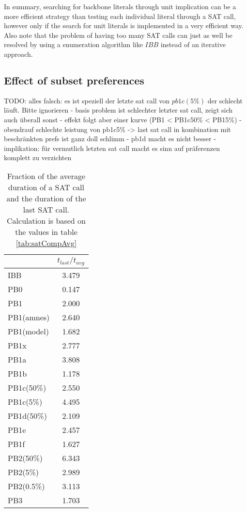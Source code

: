 In summary, searching for backbone literals through unit implication can be a more efficient strategy than testing each individual literal through a SAT call, however only if the search for unit literals is implemented in a very efficient way. Also note that the problem of having too many SAT calls can just as well be resolved by using a enumeration algorithm like $IBB$ instead of an iterative approach.

\subsection{Effect of subset preferences}
TODO: alles falsch: es ist speziell der letzte sat call von $pb1c(5\%)$ der schlecht läuft. Bitte ignorieren
- basis problem ist schlechter letzter sat call, zeigt sich auch überall sonst
- effekt folgt aber einer kurve (PB1 < PB1c50\% < PB15\%)
- obendrauf schlechte leistung von pb1c5\% -> last sat call in kombination mit beschränkten prefs ist ganz doll schlimm
- pb1d macht es nicht besser
- implikation: für vermutlich letzten sat call macht es sinn auf präferenzen komplett zu verzichten

\begin{wraptable}{R}{5cm} %
\begin{tabular}{l| c }
 & $t_{last}/t_{avg}$  \\
\hline
IBB & 3.479 \\
PB0 & 0.147 \\
PB1 & 2.000 \\
PB1(amnes) & 2.640 \\
PB1(model) & 1.682 \\
PB1x & 2.777 \\
PB1a & 3.808 \\
PB1b & 1.178 \\
PB1c(50\%) & 2.550 \\
PB1c(5\%) & 4.495 \\
PB1d(50\%) & 2.109 \\
PB1e & 2.457 \\
PB1f & 1.627 \\
PB2(50\%) & 6.343 \\
PB2(5\%) & 2.989 \\
PB2(0.5\%) & 3.113 \\
PB3 & 1.703 \\
\end{tabular}
\caption{Fraction of the average duration of a SAT call and the duration of the last SAT call. Calculation is based on the values in table \ref{tab:satCompAvg}}
\label{tab:lastTimeToAvgTime}
\end{wraptable}

